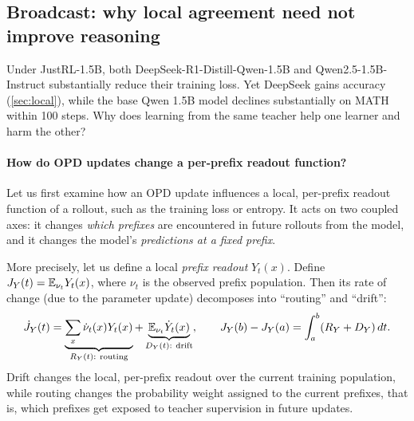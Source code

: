\subsection{Broadcast: why local agreement need not improve reasoning}
\label{sec:broadcast}\label{sec:trajectory}

Under JustRL-1.5B, both DeepSeek-R1-Distill-Qwen-1.5B and Qwen2.5-1.5B-Instruct substantially reduce their training loss. Yet DeepSeek gains accuracy (\cref{sec:local}), while the base Qwen 1.5B model declines substantially on MATH within 100 steps. Why does learning from the same teacher help one learner and harm the other?

\paragraph{How do OPD updates change a per-prefix readout function?}
Let us first examine how an OPD update influences a local, per-prefix readout function of a rollout, such as the training loss or entropy. It acts on two coupled axes: it changes \emph{which prefixes} are encountered in future rollouts from the model, and it changes the model's \emph{predictions at a fixed prefix}. 

More precisely, let us define a local \emph{prefix readout} $Y_t(x)$. Define $J_Y(t)=\mathbb{E}_{\nu_t}Y_t(x)$, where $\nu_t$ is the observed prefix population. Then its rate of change (due to the parameter update) decomposes into ``routing'' and ``drift'':
\begin{equation}
 \dot J_Y(t)=
 \underbrace{\sum_x\dot\nu_t(x)Y_t(x)}_{R_Y(t):\ \text{routing}}
 +\underbrace{\mathbb{E}_{\nu_t}\dot Y_t(x)}_{D_Y(t):\ \text{drift}},
 \qquad J_Y(b)-J_Y(a)=\int_a^b(R_Y+D_Y)\,dt.
 \label{eq:rd-law}
\end{equation}
Drift changes the local, per-prefix readout over the current training population, while routing changes the probability weight assigned to the current prefixes, that is, which prefixes get exposed to teacher supervision in future updates.

